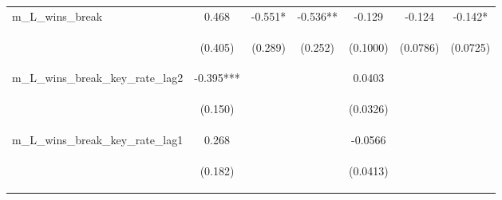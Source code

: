 \begin{tabular}{lcccccc}
m\_L\_wins\_break & 0.468 & -0.551* & -0.536** & -0.129 & -0.124 & -0.142* \\
\vspace{4pt} & \begin{footnotesize}(0.405)\end{footnotesize} & \begin{footnotesize}(0.289)\end{footnotesize} & \begin{footnotesize}(0.252)\end{footnotesize} & \begin{footnotesize}(0.1000)\end{footnotesize} & \begin{footnotesize}(0.0786)\end{footnotesize} & \begin{footnotesize}(0.0725)\end{footnotesize} \\
m\_L\_wins\_break\_key\_rate\_lag2 & -0.395*** &  &  & 0.0403 &  &  \\
\vspace{4pt} & \begin{footnotesize}(0.150)\end{footnotesize} & \begin{footnotesize}\end{footnotesize} & \begin{footnotesize}\end{footnotesize} & \begin{footnotesize}(0.0326)\end{footnotesize} & \begin{footnotesize}\end{footnotesize} & \begin{footnotesize}\end{footnotesize} \\
m\_L\_wins\_break\_key\_rate\_lag1 & 0.268 &  &  & -0.0566 &  &  \\
\vspace{4pt} & \begin{footnotesize}(0.182)\end{footnotesize} & \begin{footnotesize}\end{footnotesize} & \begin{footnotesize}\end{footnotesize} & \begin{footnotesize}(0.0413)\end{footnotesize} & \begin{footnotesize}\end{footnotesize} & \begin{footnotesize}\end{footnotesize} \\

\end{tabular}
